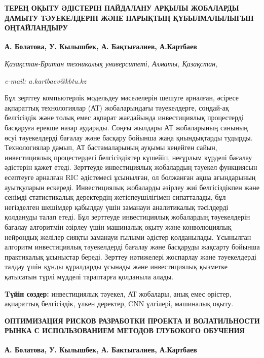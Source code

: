 \begin{articleheader}
{\bfseries ТЕРЕҢ ОҚЫТУ ӘДІСТЕРІН ПАЙДАЛАНУ АРҚЫЛЫ ЖОБАЛАРДЫ ДАМЫТУ ТӘУЕКЕЛДЕРІН ЖӘНЕ НАРЫҚТЫҢ ҚҰБЫЛМАЛЫЛЫҒЫН ОҢТАЙЛАНДЫРУ}

{\bfseries
А. Болатова,
У. Кылышбек,
А. Бақтығалиев,
А.Картбаев\textsuperscript{\envelope }}
\end{articleheader}

\begin{affiliation}
\emph{Қазақстан-Британ техникалық университеті, Алматы, Қазақстан,}

\emph{e-mail: a.kartbaev@kbtu.kz}
\end{affiliation}

Бұл зерттеу компьютерлік модельдеу мәселелерін шешуге арналған, әсіресе
ақпараттық технологиялар (АТ) жобаларындағы тәуекелдерге, сондай-ақ
белгісіздік және толық емес ақпарат жағдайында инвестициялық процестерді
басқаруға ерекше назар аударады. Соңғы жылдары АТ жобаларының санының
өсуі тәуекелдерді бағалау және басқару бойынша жаңа қиындықтарды
тудырды. Технологиялар дамып, АТ бастамаларының ауқымы кеңейген сайын,
инвестициялық процестердегі белгісіздіктер күшейіп, неғұрлым күрделі
бағалау әдістерін қажет етеді. Зерттеуде инвестициялық жобалардың
тәуекел функциясын есептеуге арналған RIC әдістемесі ұсынылған, ол
болжанған ақша ағындарының ауытқуларын ескереді. Инвестициялық жобаларды
әзірлеу жиі белгісіздікпен және сенімді статистикалық деректердің
жетіспеушілігімен сипатталады, бұл негізделген шешімдер қабылдау үшін
заманауи аналитикалық тәсілдерді қолдануды талап етеді. Бұл зерттеуде
инвестициялық жобалардың тәуекелдерін бағалау алгоритмін әзірлеу үшін
машиналық оқыту және конволюциялық нейрондық желілер сияқты заманауи
ғылыми әдістер қолданылады. Ұсынылған алгоритм инвестициялық
тәуекелдерді бағалау және басқаруды жақсарту бойынша практикалық
ұсыныстар береді. Зерттеу нәтижелері жоспарлау және тәуекелдерді талдау
үшін құнды құралдарды ұсынады және инвестициялық қызметке қатысатын
түрлі мүдделі тараптарға қолданыла алады.

{\bfseries Tүйін сөздер:} инвестициялық тәуекел, АТ жобалары, анық емес
өрістер, ақпараттық белгісіздік, үлкен деректер, CNN үлгілері, машиналық
оқыту.

\begin{articleheader}
{\bfseries ОПТИМИЗАЦИЯ РИСКОВ РАЗРАБОТКИ ПРОЕКТА И ВОЛАТИЛЬНОСТИ РЫНКА С ИСПОЛЬЗОВАНИЕМ МЕТОДОВ ГЛУБОКОГО ОБУЧЕНИЯ}

{\bfseries
А. Болатова,
У. Кылышбек,
А. Бактыгалиев,
А.Картбаев\textsuperscript{\envelope }}
\end{articleheader}

